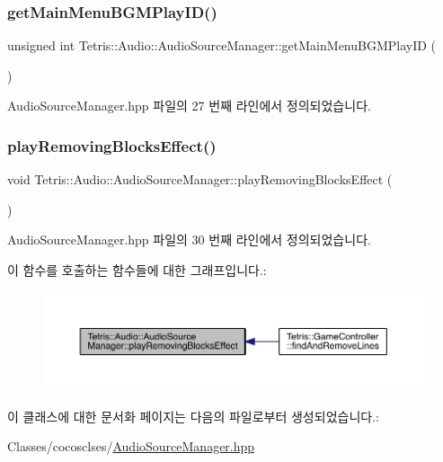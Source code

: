 \subsubsection{\texorpdfstring{get\+Main\+Menu\+B\+G\+M\+Play\+I\+D()}{getMainMenuBGMPlayID()}}
{\footnotesize\ttfamily unsigned int Tetris\+::\+Audio\+::\+Audio\+Source\+Manager\+::get\+Main\+Menu\+B\+G\+M\+Play\+ID (\begin{DoxyParamCaption}{ }\end{DoxyParamCaption})\hspace{0.3cm}{\ttfamily [inline]}}



Audio\+Source\+Manager.\+hpp 파일의 27 번째 라인에서 정의되었습니다.

\mbox{\label{class_tetris_1_1_audio_1_1_audio_source_manager_a44c761f0200291a2c8f282d8d52aa081}} 
\subsubsection{\texorpdfstring{play\+Removing\+Blocks\+Effect()}{playRemovingBlocksEffect()}}
{\footnotesize\ttfamily void Tetris\+::\+Audio\+::\+Audio\+Source\+Manager\+::play\+Removing\+Blocks\+Effect (\begin{DoxyParamCaption}{ }\end{DoxyParamCaption})\hspace{0.3cm}{\ttfamily [inline]}}



Audio\+Source\+Manager.\+hpp 파일의 30 번째 라인에서 정의되었습니다.

이 함수를 호출하는 함수들에 대한 그래프입니다.\+:
\nopagebreak
\begin{figure}[H]
\begin{center}
\leavevmode
\includegraphics[width=350pt]{class_tetris_1_1_audio_1_1_audio_source_manager_a44c761f0200291a2c8f282d8d52aa081_icgraph}
\end{center}
\end{figure}


이 클래스에 대한 문서화 페이지는 다음의 파일로부터 생성되었습니다.\+:\begin{DoxyCompactItemize}
\item 
Classes/cocosclses/\hyperlink{_audio_source_manager_8hpp}{Audio\+Source\+Manager.\+hpp}\end{DoxyCompactItemize}
